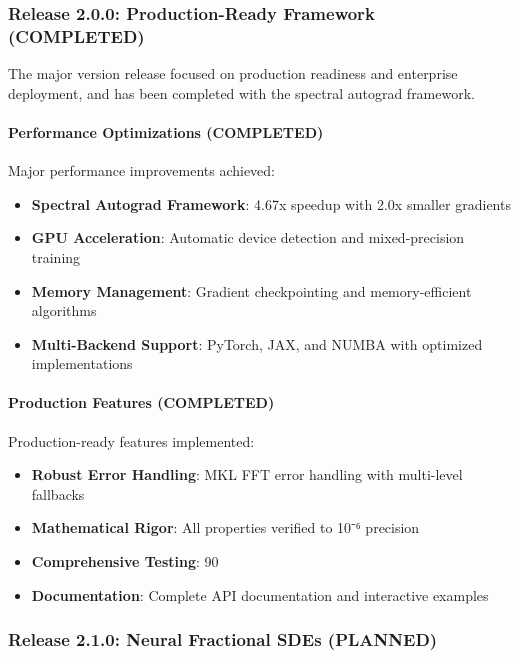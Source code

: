 \subsubsection{Release 2.0.0: Production-Ready Framework (COMPLETED)}

The major version release focused on production readiness and enterprise deployment, and has been completed with the spectral autograd framework.

\paragraph{Performance Optimizations (COMPLETED)}
Major performance improvements achieved:

\begin{itemize}
    \item \textbf{Spectral Autograd Framework}: 4.67x speedup with 2.0x smaller gradients
    \item \textbf{GPU Acceleration}: Automatic device detection and mixed-precision training
    \item \textbf{Memory Management}: Gradient checkpointing and memory-efficient algorithms
    \item \textbf{Multi-Backend Support}: PyTorch, JAX, and NUMBA with optimized implementations
\end{itemize}

\paragraph{Production Features (COMPLETED)}
Production-ready features implemented:

\begin{itemize}
    \item \textbf{Robust Error Handling}: MKL FFT error handling with multi-level fallbacks
    \item \textbf{Mathematical Rigor}: All properties verified to 10⁻⁶ precision
    \item \textbf{Comprehensive Testing}: 90%
    \item \textbf{Documentation}: Complete API documentation and interactive examples
\end{itemize}

\subsubsection{Release 2.1.0: Neural Fractional SDEs (PLANNED)}

